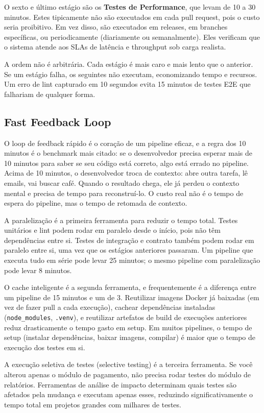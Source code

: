 O sexto e último estágio são os \textbf{Testes de Performance}, que levam de
10 a 30 minutos. Estes tipicamente não são executados em cada pull request,
pois o custo seria proibitivo. Em vez disso, são executados em releases, em branches
específicas, ou periodicamente (diariamente ou semanalmente). Eles verificam
que o sistema atende aos SLAs de latência e throughput sob carga realista.

A ordem não é arbitrária. Cada estágio é mais caro e mais lento que o anterior.
Se um estágio falha, os seguintes não executam, economizando tempo e recursos.
Um erro de lint capturado em 10 segundos evita 15 minutos de testes E2E que
falhariam de qualquer forma.

\subsection{Fast Feedback Loop}

O loop de feedback rápido é o coração de um pipeline eficaz, e a regra dos 10
minutos é o benchmark mais citado: se o desenvolvedor precisa esperar mais de
10 minutos para saber se seu código está correto, algo está errado no pipeline.
Acima de 10 minutos, o desenvolvedor troca de contexto: abre outra tarefa,
lê emails, vai buscar café. Quando o resultado chega, ele já perdeu o contexto
mental e precisa de tempo para reconstruí-lo. O custo real não é o tempo de
espera do pipeline, mas o tempo de retomada de contexto.

A paralelização é a primeira ferramenta para reduzir o tempo total. Testes
unitários e lint podem rodar em paralelo desde o início, pois não têm
dependências entre si. Testes de integração e contrato também podem rodar em
paralelo entre si, uma vez que os estágios anteriores passaram. Um pipeline
que executa tudo em série pode levar 25 minutos; o mesmo pipeline com
paralelização pode levar 8 minutos.

O cache inteligente é a segunda ferramenta, e frequentemente é a diferença
entre um pipeline de 15 minutos e um de 3. Reutilizar imagens Docker já
baixadas (em vez de fazer pull a cada execução), cachear dependências
instaladas (\texttt{node\_modules}, \texttt{.venv}), e reutilizar artefatos de
build de execuções anteriores reduz drasticamente o tempo gasto em setup. Em
muitos pipelines, o tempo de setup (instalar dependências, baixar imagens,
compilar) é maior que o tempo de execução dos testes em si.

A execução seletiva de testes (selective testing) é a terceira ferramenta. Se
você alterou apenas o módulo de pagamento, não precisa rodar testes do módulo
de relatórios. Ferramentas de análise de impacto determinam quais testes são
afetados pela mudança e executam apenas esses, reduzindo significativamente o
tempo total em projetos grandes com milhares de testes.

